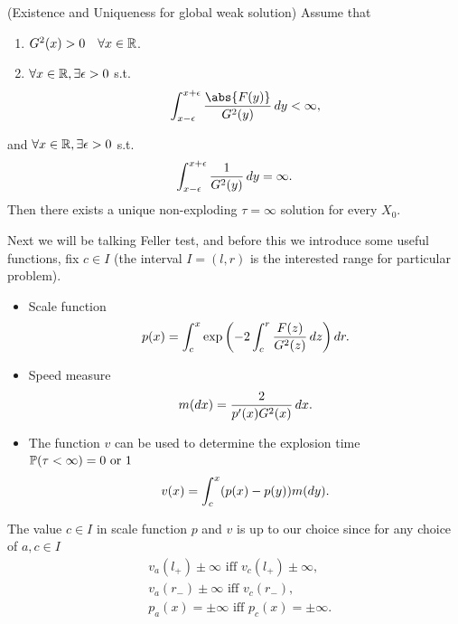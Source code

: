 \begin{thm}{(Existence and Uniqueness for global weak solution)}
Assume that 
\begin{enumerate}
    \item $G^2(x) > 0 \quad \forall x\in \mathbb{R}$.
    \item $\forall x \in \mathbb{R}, \exists \epsilon >0$ s.t. \begin{equation*}
        \int_{x-\epsilon}^{x+\epsilon} \frac{\abs{F(y)}}{G^2(y)} \diff y < \infty,  
    \end{equation*}
\end{enumerate}
and $\forall x \in \mathbb{R}, \exists \epsilon >0$ s.t.
\begin{equation*}
    \int_{x-\epsilon}^{x+\epsilon} \frac{1}{G^2(y)} \mathop{}\!d y = \infty.   
\end{equation*}
Then there exists a unique non-exploding $\tau = \infty$ solution for every $X_0$.
\end{thm}

Next we will be talking Feller test, and before this we introduce some useful functions, fix $c\in I$ (the interval $I = (l, r)$ is the interested range for particular problem).
\begin{itemize}
    \item Scale function
        \begin{equation*}
            p(x) = \int_c^x \exp\left(-2 \int_c^r \frac{F(z)}{G^2(z)} \mathop{}\!d z \right) \mathop{}\!d r.
        \end{equation*}
    \item Speed measure
        \begin{equation*}
            m(\mathop{}\!d x) = \frac{2}{p'(x) G^2(x)} \mathop{}\!d x.
        \end{equation*}
    \item The function $v$ can be used to determine the explosion time $\mathbb{P}(\tau <\infty) = 0 \text{ or } 1$
        \begin{equation*}
            v(x) = \int_c^x (p(x)- p(y)) m(\mathop{}\!d y).
        \end{equation*}
\end{itemize}
\begin{rem}
The value $c\in I$ in scale function $p$ and $v$ is up to our choice since for any choice of $a,c \in I$
\begin{align*}
    &v_a(l_+) \pm \infty \text{ iff } v_c(l_+) \pm \infty, \\
    &v_a(r_-) \pm \infty \text{ iff } v_c(r_-), \\
    & p_a(x) = \pm \infty \text{ iff } p_c(x) = \pm \infty.
\end{align*}
\end{rem}


